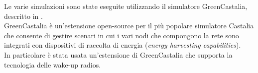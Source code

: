 Le varie simulazioni sono state eseguite utilizzando il simulatore GreenCastalia, descritto in \cite{gCastalia}. \\
GreenCastalia è un'estensione open-source per il più popolare simulatore Castalia \cite{castalia} che consente di gestire scenari in cui i vari nodi che compongono la rete sono integrati con dispositivi di raccolta di energia (\textit{energy harvesting capabilities}).\\
In particolare è stata usata un'estensione di GreenCastalia che supporta la tecnologia delle wake-up radios.